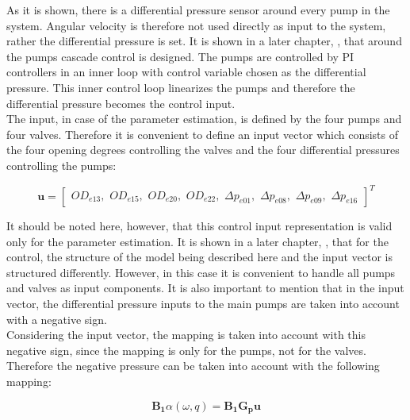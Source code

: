 As it is shown, there is a differential pressure sensor around every pump in the system. Angular velocity is therefore not used directly as input to the system, rather the differential pressure is set. It is shown in a later chapter, , that around the pumps cascade control is designed. The pumps are controlled by PI controllers in an inner loop with control variable chosen as the differential pressure. This inner control loop linearizes the pumps and therefore the differential pressure becomes the control input. 
\\
The input, in case of the parameter estimation, is defined by the four pumps and four valves. Therefore it is convenient to define an input vector which consists of the four opening degrees controlling the valves and the four differential pressures controlling the pumps: 

\begin{equation}
\bm{u} =
\begin{bmatrix} 
OD_{e13},\hspace{4pt} 
OD_{e15},\hspace{4pt} 
OD_{e20},\hspace{4pt} 
OD_{e22},\hspace{4pt} 
\Delta p_{e01},\hspace{4pt} 
\Delta p_{e08},\hspace{4pt} 
\Delta p_{e09},\hspace{4pt} 
\Delta p_{e16} 
\label{inputvector}
\end{bmatrix} ^T
\end{equation}

It should be noted here, however, that this control input representation is valid only for the parameter estimation. It is shown in a later chapter, , that for the control, the structure of the model being described here and the input vector is structured differently. However, in this case it is convenient to handle all pumps and valves as input components. It is also important to mention that in the input vector, the differential pressure inputs to the main pumps are taken into account with a negative sign.
\\
Considering the input vector, the mapping is taken into account with this negative sign, since the mapping is only for the pumps, not for the valves. Therefore the negative pressure can be taken into account with the following mapping: 

\begin{equation}
\bm{B_1} \alpha(\omega, q) = \bm{B_1} \bm{G_p} \bm{u}
\label{gamma_lin}
\end{equation}


